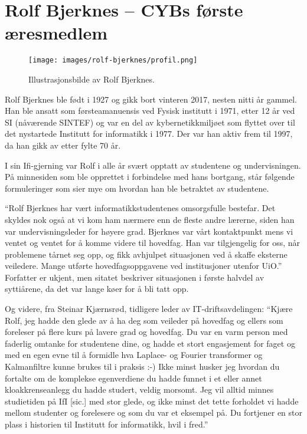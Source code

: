 \chapter[Rolf Bjerknes]{Rolf Bjerknes -- CYBs første æresmedlem}

\author{Skrevet av Narve Trædal}

\begin{wrapfigure}{r}{6cm}
	\centering
	\texttt{[image: images/rolf-bjerknes/profil.png]}
	\label{fig:rolf-bjerknes}
	\caption{Illustrasjonsbilde av Rolf Bjerknes.}
\end{wrapfigure}

Rolf Bjerknes ble født i 1927 og gikk bort vinteren 2017, nesten nitti år gammel. Han ble ansatt som førsteamanuensis ved Fysisk institutt i 1971, etter 12 år ved SI (nåværende SINTEF) og var en del av kybernetikkmiljøet som flyttet over til det nystartede Institutt for informatikk i 1977. Der var han
aktiv frem til 1997, da han gikk av etter fylte 70 år.

I sin Ifi-gjerning var Rolf i alle år svært opptatt av studentene og undervisningen. På minnesiden som ble opprettet i forbindelse med hans bortgang, står følgende formuleringer som sier mye om hvordan han ble betraktet av studentene.

``Rolf Bjerknes har vært informatikkstudentenes omsorgsfulle bestefar. Det skyldes nok også at vi kom ham nærmere enn de fleste andre lærerne, siden han var undervisningsleder for høyere grad. Bjerknes var vårt kontaktpunkt mens vi ventet og ventet for å komme videre til hovedfag. Han var tilgjengelig for oss, når problemene tårnet seg opp, og fikk avhjulpet situasjonen ved å skaffe eksterne veiledere. Mange utførte hovedfagsoppgavene ved institusjoner utenfor UiO.'' Forfatter er ukjent, men sitatet beskriver situasjonen i første halvdel av syttiårene, da det var lange køer for å bli tatt opp.

Og videre, fra Steinar Kjærnsrød, tidligere leder av IT-driftsavdelingen: ``Kjære Rolf, jeg hadde den glede av å ha deg som veileder på hovedfag og ellers som foreleser på flere kurs på lavere grad og hovedfag. Du var en varm person med faderlig omtanke for studentene dine, og hadde et stort engasjement for faget og med en egen evne til å formidle hva Laplace- og Fourier transformer og Kalmanfiltre kunne brukes til i praksis :-) Ikke minst husker jeg hvordan du fortalte om de komplekse egenverdiene du hadde funnet i et eller annet kloakkrenseanlegg du hadde studert, veldig morsomt. Jeg vil alltid minnes studietiden på IfI [sic.] med stor glede, og ikke minst det tette forholdet vi hadde mellom studenter og forelesere og som du var et eksempel på. Du fortjener en stor plass i historien til Institutt for informatikk, hvil i fred.''

